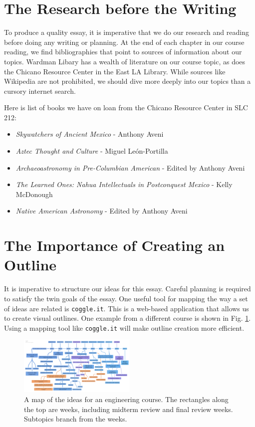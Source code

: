 \documentclass{article}
\begin{document}
\section{The Research before the Writing}

To produce a quality essay, it is imperative that we do our research and reading before doing any writing or planning.  At the end of each chapter in our course reading, we find bibliographies that point to sources of information about our topics.  Wardman Libary has a wealth of literature on our course topic, as does the Chicano Resource Center in the East LA Library.  While sources like Wikipedia are not prohibited, we should dive more deeply into our topics than a cursory internet search.

Here is list of books we have on loan from the Chicano Resource Center in SLC 212:

\begin{itemize}
\item \textit{Skywatchers of Ancient Mexico} - Anthony Aveni
\item \textit{Aztec Thought and Culture} - Miguel Le\'{o}n-Portilla
\item \textit{Archaeoastronomy in Pre-Columbian American} - Edited by Anthony Aveni
\item \textit{The Learned Ones: Nahua Intellectuals in Postconquest Mexico} - Kelly McDonough
\item \textit{Native American Astronomy} - Edited by Anthony Aveni
\end{itemize}

\section{The Importance of Creating an Outline}

It is imperative to structure our ideas for this essay.  Careful planning is required to satisfy the twin goals of the essay.  One useful tool for mapping the way a set of ideas are related is \verb+coggle.it+.  This is a web-based application that allows us to create visual outlines.  One example from a different course is shown in Fig. \ref{fig:1}.  Using a mapping tool like \verb+coggle.it+ will make outline creation more efficient.

\begin{figure}[hb]
\centering
\includegraphics[width=0.5\textwidth]{RF_Field_Engineer_Course_timeline.png}
\caption{\label{fig:1} A map of the ideas for an engineering course.  The rectangles along the top are weeks, including midterm review and final review weeks.  Subtopics branch from the weeks.}
\end{figure}
\end{document}
